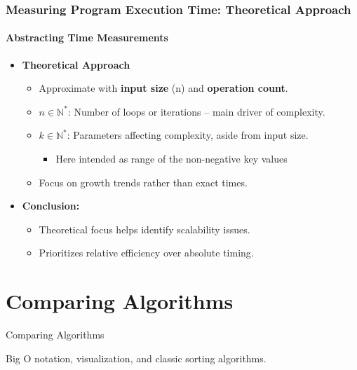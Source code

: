 \documentclass[compress,12pt,bookmark]{beamer}
\begin{document}
\begin{frame}
    \frametitle{Measuring Program Execution Time: Theoretical Approach}
    \framesubtitle{Abstracting Time Measurements}

    \begin{itemize}
        \item \textbf{Theoretical Approach}
              \begin{itemize}
                  \item Approximate with \textbf{input size} (n) and \textbf{operation count}.
                  \item $n \in \mathbb{N}^*$: Number of loops or iterations -- main driver of complexity.
                  \item $k \in \mathbb{N}^*$: Parameters affecting complexity, aside from input size.
                        \begin{itemize}
                            \item Here intended as range of the non-negative key values
                        \end{itemize}
                  \item Focus on growth trends rather than exact times.
              \end{itemize}
        \item \textbf{Conclusion:}
              \begin{itemize}
                  \item Theoretical focus helps identify scalability issues.
                  \item Prioritizes relative efficiency over absolute timing.
              \end{itemize}
    \end{itemize}
\end{frame}

\section{Comparing Algorithms}

\begin{frame}
    \centering
    \Huge
    Comparing Algorithms

    \normalsize
    Big O notation, visualization, and classic sorting algorithms.
    \vfill
\end{frame}
\end{document}
